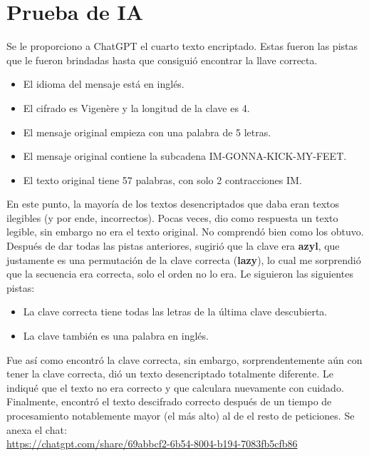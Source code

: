 \section{Prueba de IA}
Se le proporciono a ChatGPT el cuarto texto encriptado. Estas fueron las pistas que le fueron brindadas hasta que consiguió encontrar la llave correcta.
\begin{itemize}
	\item El idioma del mensaje está en inglés.
	\item El cifrado es Vigenère y la longitud de la clave es 4.
	\item El mensaje original empieza con una palabra de 5 letras.
	\item El mensaje original contiene la subcadena IM-GONNA-KICK-MY-FEET.
	\item El texto original tiene 57 palabras, con solo 2 contracciones IM.
\end{itemize}
En este punto, la mayoría de los textos desencriptados que daba eran textos ilegibles (y por ende, incorrectos). Pocas veces, dio como respuesta un texto legible, sin embargo no era el texto original. No comprendó bien como los obtuvo.
Después de dar todas las pistas anteriores, sugirió que la clave era \textbf{azyl}, que justamente es una permutación de la clave correcta (\textbf{lazy}), lo cual me sorprendió que la secuencia era correcta, solo el orden no lo era. Le siguieron las siguientes pistas:
\begin{itemize}
	\item La clave correcta tiene todas las letras de la última clave descubierta.
	\item La clave también es una palabra en inglés.
\end{itemize}
Fue así como encontró la clave correcta, sin embargo, sorprendentemente aún con tener la clave correcta, dió un texto desencriptado totalmente diferente. Le indiqué que el texto no era correcto y que calculara nuevamente con cuidado. \\
Finalmente, encontró el texto descifrado correcto después de un tiempo de procesamiento notablemente mayor (el más alto) al de el resto de peticiones. Se anexa el chat: \\
\url{https://chatgpt.com/share/69abbcf2-6b54-8004-b194-7083fb5cfb86}